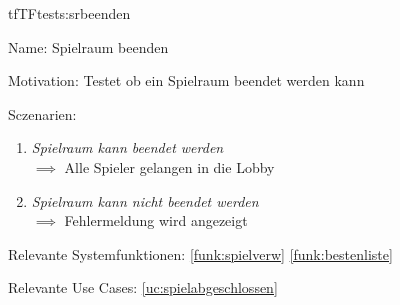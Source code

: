 \begin{description}[leftmargin=5em, style=sameline]

\begin{lhp}{tf}{TF}{tests:srbeenden}
	\item [Name:] Spielraum beenden
	\item [Motivation:] Testet ob ein Spielraum beendet werden kann
	\item [Sczenarien:] \hfill
		\begin{enumerate}
			\item \textit{Spielraum kann beendet werden } \\ $\implies$ Alle Spieler gelangen in die Lobby
			
			\item \textit{ Spielraum kann nicht beendet werden} \\ $\implies$ Fehlermeldung wird angezeigt
			
			
		\end{enumerate}
	\item [Relevante Systemfunktionen:] \ref{funk:spielverw} \ref{funk:bestenliste}
	\item [Relevante Use Cases:] \ref{uc:spielabgeschlossen}
\end{lhp}

\end{description}


